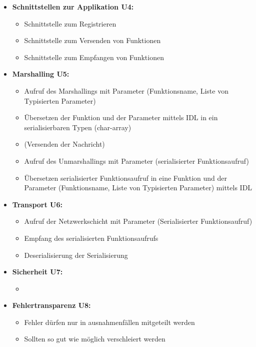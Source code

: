 \begin{itemize}
	\item \textbf{Schnittstellen zur Applikation U4:}\\
	\begin{itemize}
		\item Schnittstelle zum Registrieren
		\item Schnittstelle zum Versenden von Funktionen
		\item Schnittstelle zum Empfangen von Funktionen
	\end{itemize}
	
	\item \textbf{Marshalling U5:}\\
	\begin{itemize}
		\item Aufruf des Marshallings mit Parameter (Funktionsname, Liste von Typisierten Parameter)
		\item Übersetzen der Funktion und der Parameter mittels IDL in ein serialisierbaren Typen (char-array)
		\item (Versenden der Nachricht)
		\item Aufruf des Unmarshallings mit Parameter (serialisierter Funktionsaufruf)
		\item Übersetzen serialisierter Funktionsaufruf in eine Funktion und der Parameter (Funktionsname, Liste von Typisierten Parameter) mittels IDL
	\end{itemize}
	
	\item \textbf{Transport U6:}\\
	\begin{itemize}
		\item Aufruf der Netzwerkschicht mit Parameter (Serialisierter Funktionsaufruf)
		\item Empfang des serialisierten Funktionsaufrufs
		\item Deserialisierung der Serialisierung
	\end{itemize}
	
	\item \textbf{Sicherheit U7:}\\
	\begin{itemize}
		\item 
	\end{itemize}
	
	\item \textbf{Fehlertransparenz U8:}\\
	\begin{itemize}
		\item Fehler dürfen nur in ausnahmenfällen mitgeteilt werden
		\item Sollten so gut wie möglich verschleiert werden
	\end{itemize}
	

\end{itemize}
